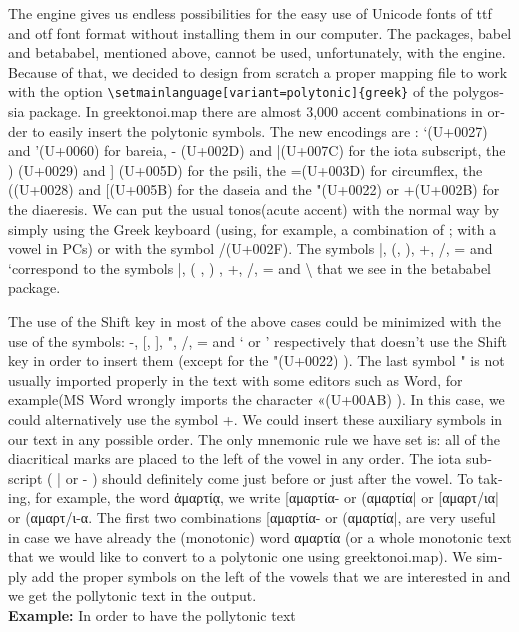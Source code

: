 \documentclass{article}
\let\tb=\textbackslash
\begin{document}
\begin{english}
The \XeTeX{} engine  gives us endless possibilities  for  the easy use of  Unicode fonts of ttf and otf font format without installing them in our computer. The  packages, babel and betababel, mentioned  above, cannot be used, unfortunately, with the \XeTeX{} engine. Because of that, we decided to design from scratch a proper mapping file to work with  the option \verb'\setmainlanguage[variant=polytonic]{greek}' of the \textsf{polygossia}  package. In \textsf{greektonoi.map} there are  almost 3,000 accent combinations in order to easily insert the polytonic symbols. The new encodings are : `(U+0027) and  '(U+0060) for  bareia, - (U+002D) and |(U+007C) for the iota subscript, the ) (U+0029) and ] (U+005D) for the psili, the =(U+003D) for circumflex,  the ((U+0028) and [(U+005B) for the daseia and  the "(U+0022) or +(U+002B) for the diaeresis. We can put the usual tonos(acute accent) with the normal way  by simply using the Greek keyboard (using, for example, a combination of ; with a vowel in PCs) or with the symbol /(U+002F). The symbols |, (, ), +, /, = and  `correspond to the  symbols |, ( , ) , +, /, = and  \tb{} that we see in the \textsf{betababel} package.


The use of the \textsf{Shift} key in most of the above cases could be minimized with the use of the symbols: -, [, ], ",  /,  = and ` or ' respectively that doesn’t  use  the \textsf{Shift} key in order to  insert them (except for the  "(U+0022) ). The last symbol " is not usually imported properly in the text with some  editors such as Word, for example(MS Word  wrongly imports the character  «(U+00AB) ).
In this case, we could alternatively use the symbol +. We could insert  these auxiliary symbols in our text in any possible  order. The only mnemonic rule we have set is: all of the diacritical marks are placed to the left of the vowel in any order. The iota subscript ( | or - ) should definitely come just before  or just after  the vowel. To taking, for example, the word ἁμαρτίᾳ, we write [αμαρτία- or (αμαρτία| or [αμαρτ/ια| or (αμαρτ/ι-α. The first two combinations [αμαρτία- or (αμαρτία|, are very useful in case we have already the (monotonic) word αμαρτία (or a whole monotonic text that we would like to convert  to a polytonic one using \textsf{greektonoi.map}).  We simply add the proper symbols on the left of the vowels that we are interested in and we get the pollytonic text in the output.\vspace{1em}\\ \noindent
{\bf Example:} In order to have the pollytonic text


\end{english}
\end{document}
